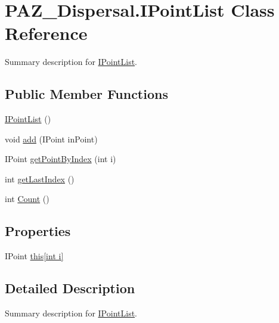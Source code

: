\hypertarget{class_p_a_z___dispersal_1_1_i_point_list}{\section{P\-A\-Z\-\_\-\-Dispersal.\-I\-Point\-List Class Reference}
\label{class_p_a_z___dispersal_1_1_i_point_list}
}


Summary description for \hyperlink{class_p_a_z___dispersal_1_1_i_point_list}{I\-Point\-List}.  


\subsection*{Public Member Functions}
\begin{DoxyCompactItemize}
\item 
\hyperlink{class_p_a_z___dispersal_1_1_i_point_list_afe8fc9026b9105085106c0ca4a4983b6}{I\-Point\-List} ()
\item 
void \hyperlink{class_p_a_z___dispersal_1_1_i_point_list_a4c7a4d341eeab4e26206e066010db5a3}{add} (I\-Point in\-Point)
\item 
I\-Point \hyperlink{class_p_a_z___dispersal_1_1_i_point_list_abd18aca7031f4097cdddea6791303290}{get\-Point\-By\-Index} (int i)
\item 
int \hyperlink{class_p_a_z___dispersal_1_1_i_point_list_a1bdb5f9a6b51b7105a8527e0f49080b3}{get\-Last\-Index} ()
\item 
int \hyperlink{class_p_a_z___dispersal_1_1_i_point_list_a42edb3eaccb4584747e93ed21004fd2a}{Count} ()
\end{DoxyCompactItemize}
\subsection*{Properties}
\begin{DoxyCompactItemize}
\item 
I\-Point \hyperlink{class_p_a_z___dispersal_1_1_i_point_list_a552cef990c32ea763137e7a9c8b2f8d5}{this\mbox{[}int i\mbox{]}}
\end{DoxyCompactItemize}


\subsection{Detailed Description}
Summary description for \hyperlink{class_p_a_z___dispersal_1_1_i_point_list}{I\-Point\-List}. 



